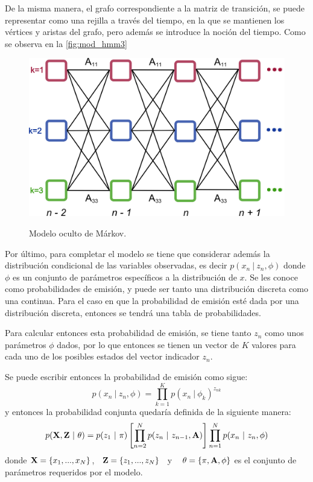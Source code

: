 De la misma manera, el grafo correspondiente a la matriz de transición, se puede representar 
como una rejilla a través del tiempo, en la que se mantienen los vértices y aristas del grafo, 
pero además se introduce la noción del tiempo. Como se observa en la \autoref{fig:mod_hmm3} 

\begin{figure}[hbt]
        \myfloatalign
        {\includegraphics[width=0.63\linewidth]{gfx/3-mod-hmm3}}
        \caption{Modelo oculto de Márkov.}
        \label{fig:mod_hmm3}
\end{figure}

Por último, para completar el modelo se tiene que considerar además la distribución condicional 
de las variables observadas, es decir $p(x_n ~|~ z_n, \phi)$ donde $\phi$ es un conjunto de 
parámetros específicos a la distribución de $x$. Se les conoce como probabilidades de emisión, 
y puede ser tanto una distribución discreta como una continua. Para el caso en que la probabilidad
de emisión esté dada por una distribución discreta, entonces se tendrá una tabla de probabilidades.

Para calcular entonces esta probabilidad de emisión, se tiene tanto $z_n$ como unos parámetros $\phi$ 
dados, por lo que entonces se tienen un vector de $K$ valores para cada uno de los posibles estados del 
vector indicador $z_n$.

Se puede escribir entonces la probabilidad de emisión como sigue:
\begin{equation}
p(x_n ~|~ z_n, \phi) = \prod_{k=1}^K p(x_n ~|~ \phi_k) ^ {z_{nk}}
\end{equation}
y entonces la probabilidad conjunta quedaría definida de la siguiente manera:
\begin{equation}
p(\textbf{X}, \textbf{Z} ~|~ \theta) 
= p(z_1 ~|~ \pi) \left[ \prod_{n=2}^N p(z_n ~|~ z_{n-1}, \textbf{A}) \right]
\prod_{n=1}^N p(x_n ~|~ z_n, \phi)
\label{eqn:3-11}
\end{equation}
donde $\textbf{X} = \lbrace x_1, ..., x_N \rbrace$,~ $\textbf{Z} = \lbrace z_1, ..., z_N \rbrace$~ y ~
$\theta = \lbrace \pi, \textbf{A}, \phi \rbrace$ es el conjunto de parámetros requeridos por el modelo.

